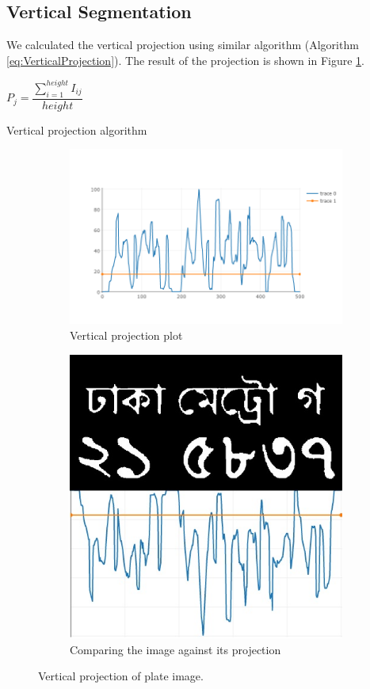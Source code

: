 \documentclass{standalone}
\begin{document}
\subsection{Vertical Segmentation}
We calculated the vertical projection using similar algorithm (Algorithm \ref{eq:VerticalProjection}). The result of the projection is shown in Figure \ref{fig:VerticalProjection}.

\begin{algorithm}
  \begin{algorithmic}
        \State $P_j = \dfrac{ \sum^{height}_{i=1}{ I_{ij} } }{ height }$
    \EndFor
  \end{algorithmic}
  \caption{Vertical projection algorithm}
  \label{eq:VerticalProjection}
\end{algorithm}

\begin{figure}
\centering
\begin{subfigure}{0.9\textwidth}
  \centering
  \includegraphics[width=0.8\linewidth]{./img/plots/vertical-1}
  \caption{Vertical projection plot}
\end{subfigure}
\begin{subfigure}{0.8\textwidth}
  \centering
  \includegraphics[width=0.8\linewidth]{./img/plots/vertical-2}
  \caption{Comparing the image against its projection}
\end{subfigure}
\caption{Vertical projection of plate image.}
\label{fig:VerticalProjection}
\end{figure}
\end{document}
